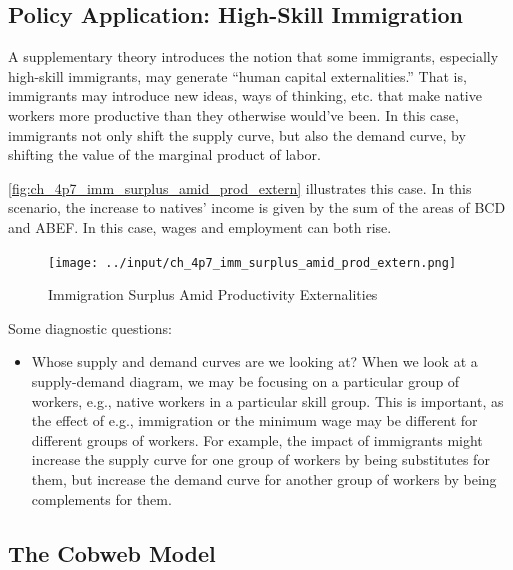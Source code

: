 \subsection{Policy Application: High-Skill Immigration}

A supplementary theory introduces the notion that 
some immigrants, especially high-skill immigrants, 
may generate ``human capital externalities.''
That is, immigrants may introduce 
new ideas, ways of thinking, etc. that make 
native workers more productive than they 
otherwise would've been.
In this case, immigrants not only shift the supply curve, 
but also the demand curve, by shifting the 
value of the marginal product of labor.

\autoref{fig:ch_4p7_imm_surplus_amid_prod_extern}
illustrates this case. In this scenario,
the increase to natives' income is 
given by the sum of the areas of BCD and 
ABEF. In this case, wages and employment can both rise.


\begin{figure}[!htb]
    \centering
        \texttt{[image: ../input/ch\_4p7\_imm\_surplus\_amid\_prod\_extern.png]}
    \caption{Immigration Surplus Amid Productivity Externalities}
    \label{fig:ch_4p7_imm_surplus_amid_prod_extern}
\end{figure}

\begin{notes}
    Some diagnostic questions:
    \begin{itemize}
        \item Whose supply and demand curves are we looking at? When we look at 
            a supply-demand diagram, we may be focusing on 
            a particular group of workers, e.g.,
            native workers in a particular skill group.
            This is important, as the effect of e.g., immigration or 
            the minimum wage may be different for different groups of workers.
            For example, the impact of immigrants might increase the supply 
            curve for one group of workers by being 
            substitutes for them, but increase the demand curve
            for another group of workers by being complements for them.
    \end{itemize}
\end{notes}

\subsection{The Cobweb Model}

